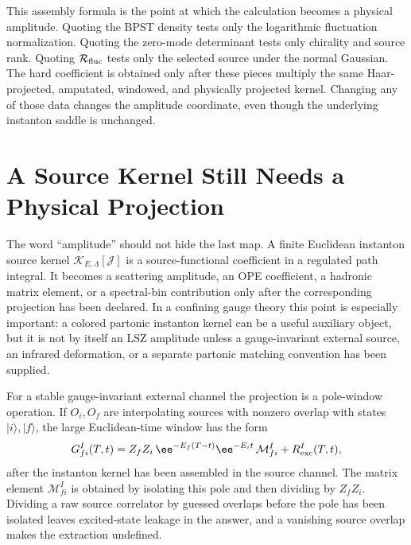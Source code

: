 This assembly formula is the point at which the calculation becomes a
physical amplitude.  Quoting the BPST density tests only the logarithmic
fluctuation normalization.  Quoting the zero-mode determinant tests only chirality and
source rank.  Quoting
\(\mathcal R_{\rm fluc}\) tests only the selected source under the normal
Gaussian.  The hard coefficient is obtained only after these pieces multiply
the same Haar-projected, amputated, windowed, and physically projected kernel.
Changing any of those data changes the amplitude coordinate, even though the
underlying instanton saddle is unchanged.

\section{A Source Kernel Still Needs a Physical Projection}
\label{sec:instanton-source-kernel-physical-projection}

The word ``amplitude'' should not hide the last map.  A finite Euclidean
instanton source kernel
\(\mathcal K_{E,\Lambda}[\mathcal J]\) is a source-functional coefficient in a
regulated path integral.  It becomes a scattering amplitude, an OPE
coefficient, a hadronic matrix element, or a spectral-bin contribution only
after the corresponding projection has been declared.  In a confining gauge
theory this point is especially important: a colored partonic instanton kernel
can be a useful auxiliary object, but it is not by itself an LSZ amplitude
unless a gauge-invariant external source, an infrared deformation, or a
separate partonic matching convention has been supplied.

For a stable gauge-invariant external channel the projection is a pole-window
operation.  If \(O_i,O_f\) are interpolating sources with nonzero overlap with
states \(|i\rangle,|f\rangle\), the large Euclidean-time window has the form
\begin{equation}
  G_{fi}^{I}(T,t)
  =
  Z_f Z_i\,
  \ee^{-E_f(T-t)}\ee^{-E_i t}\,
  \mathcal M_{fi}^{I}
  +R_{\rm exc}^{I}(T,t),
  \label{eq:instanton-hadronic-pole-window}
\end{equation}
after the instanton kernel has been assembled in the source channel.  The
matrix element \(\mathcal M_{fi}^{I}\) is obtained by isolating this pole and
then dividing by \(Z_fZ_i\).  Dividing a raw source correlator by guessed
overlaps before the pole has been isolated leaves excited-state leakage in the
answer, and a vanishing source overlap makes the extraction undefined.


